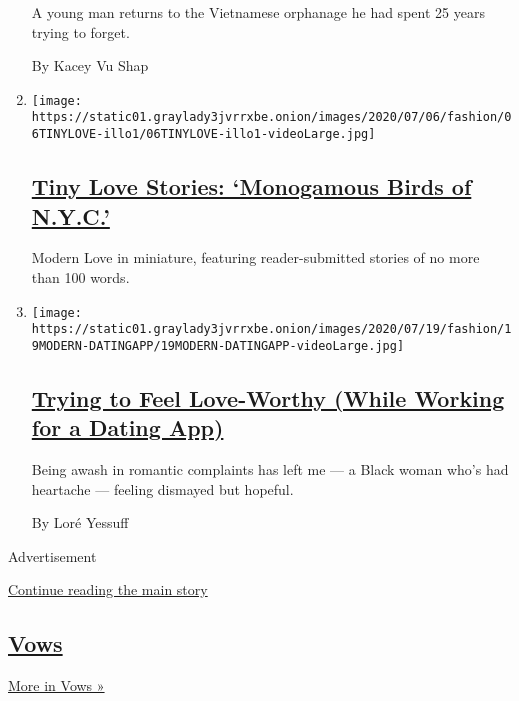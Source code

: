 \begin{enumerate}
  A young man returns to the Vietnamese orphanage he had spent 25 years
  trying to forget.

  By Kacey Vu Shap
\item
  \texttt{[image: https://static01.graylady3jvrrxbe.onion/images/2020/07/06/fashion/06TINYLOVE-illo1/06TINYLOVE-illo1-videoLarge.jpg]}

  \hypertarget{tiny-love-stories-monogamous-birds-of-nyc}{%
  \subsection{\texorpdfstring{\href{/2020/07/21/style/tiny-modern-love-stories-coronavirus-monogamous-birds-of-nyc.html}{Tiny
  Love Stories: `Monogamous Birds of
  N.Y.C.'}}{Tiny Love Stories: `Monogamous Birds of N.Y.C.'}}\label{tiny-love-stories-monogamous-birds-of-nyc}}

  Modern Love in miniature, featuring reader-submitted stories of no
  more than 100 words.
\item
  \texttt{[image: https://static01.graylady3jvrrxbe.onion/images/2020/07/19/fashion/19MODERN-DATINGAPP/19MODERN-DATINGAPP-videoLarge.jpg]}

  \hypertarget{trying-to-feel-love-worthy-while-working-for-a-dating-app}{%
  \subsection{\texorpdfstring{\href{/2020/07/17/style/modern-love-feel-love-worthy-working-for-dating-app.html}{Trying
  to Feel Love-Worthy (While Working for a Dating
  App)}}{Trying to Feel Love-Worthy (While Working for a Dating App)}}\label{trying-to-feel-love-worthy-while-working-for-a-dating-app}}

  Being awash in romantic complaints has left me --- a Black woman who's
  had heartache --- feeling dismayed but hopeful.

  By Loré Yessuff
\end{enumerate}

Advertisement

\protect\hyperlink{after-mid2}{Continue reading the main story}

\hypertarget{vows-3}{%
\subsection{\texorpdfstring{\href{/column/vows}{Vows}}{Vows}}\label{vows-3}}

\href{/column/vows}{More in Vows »}


